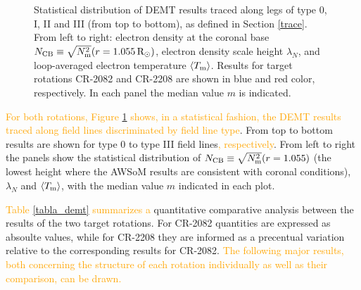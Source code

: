 \documentclass[namedreferences]{solarphysics}
\newcommand{\mrsun}{{\rm R_\odot}}
\newcommand{\lN}{\lambda_N}
\newcommand{\NCB}{N_{\rm CB}}
\newcommand{\Tm}{T_{\rm m}}
\newcommand{\aTm}{\left<\Tm\right>}
\newcommand{\Nsqm}{N^2_{{\rm m}}}
\newcommand{\sqravgN}{\sqrt{\Nsqm}}
\def\albert#1{\textcolor{orange}{#1}}
\begin{document}
\begin{article}
\begin{figure}[h!]
\begin{center}
\caption{{Statistical distribution of DEMT results traced along legs of type 0, I, II and III (from top to bottom), as defined in Section \ref{trace}. From left to right: electron density at the coronal base $\NCB\equiv\sqravgN(r=1.055\,\mrsun)$, electron density scale height $\lN$, and loop-averaged electron temperature $\aTm$. Results for target rotations CR-2082 and CR-2208 are shown in blue and red color, respectively. In each panel the median value $m$ is indicated.} }
\label{histos_fulldemt}
\end{center}
\end{figure} 

\albert{For both rotations, Figure \ref{histos_fulldemt} shows, in a statistical fashion, the DEMT results traced along field lines discriminated by field line type}. From top to bottom {results are shown for} type 0 to type III {field lines}\albert{, respectively}. From left to right the panels show the statistical distribution of $\NCB \equiv \sqravgN(r=1.055)$ {(the lowest height where the AWSoM results are consistent with coronal conditions)}, $\lN$ {and} $\aTm$, {with the median value $m$ indicated in each plot}.


\albert{Table \ref{tabla_demt} summarizes a} quantitative comparative analysis between the results of the two {target rotations}. For CR-2082 quantities are expressed as absoulte values, {while} for CR-2208 they are informed {as a precentual variation} relative to the corresponding results for CR-2082. \albert{The following major results, both concerning the structure of each rotation individually as well as their comparison, can be drawn.}


\end{article}
\end{document}
